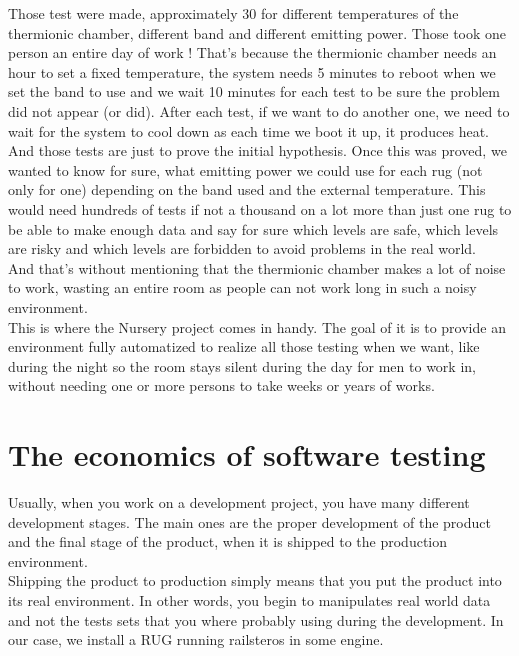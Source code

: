 \documentclass[12pt]{article}
\theoremstyle{definition}
\theoremstyle{definition}
\begin{document}
Those test were made, approximately 30 for different temperatures of the thermionic chamber, different band and different emitting power. Those took one person an entire day of work ! That's because the thermionic chamber needs an hour to set a fixed temperature, the system needs 5 minutes to reboot when we set the band to use and we wait 10 minutes for each test to be sure the problem did not appear (or did). After each test, if we want to do another one, we need to wait for the system to cool down as each time we boot it up, it produces heat.\\

And those tests are just to prove the initial hypothesis. Once this was proved, we wanted to know for sure, what emitting power we could use for each \gls{rug} (not only for one) depending on the band used and the external temperature. This would need hundreds of tests if not a thousand on a lot more than just one \gls{rug} to be able to make enough data and say for sure which levels are safe, which levels are risky and which levels are forbidden to avoid problems in the real world.\\

And that's without mentioning that the thermionic chamber makes a lot of noise to work, wasting an entire room as people can not work long in such a noisy environment.\\

This is where the Nursery project comes in handy. The goal of it is to provide an environment fully automatized to realize all those testing when we want, like during the night so the room stays silent during the day for men to work in, without needing one or more persons to take weeks or years of works.

\section{The economics of software testing}

Usually, when you work on a development project, you have many different development stages. The main ones are the proper development of the product and the final stage of the product, when it is shipped to the production environment.\\

Shipping the product to production simply means that you put the product into its real environment. In other words, you begin to manipulates real world data and not the tests sets that you where probably using during the development. In our case, we install a RUG running \gls{railsteros} in some engine.\\
\end{document}
